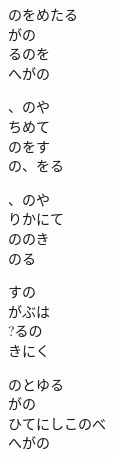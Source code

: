 \documentclass[10pt,b5j]{tarticle} %
\begin{document}
\vspace{1.5em} %
\newcommand{\linespace}{0.5em} %
\newcommand{\blocksize}{0.5\hsize} %
\begin{enumerate} %
    \begin{minipage}[c]{\blocksize}
    
        \vspace{\linespace}
        \item
        のをめたる\\
        がの\\
        るのを\\
        へがの
        
        \vspace{\linespace}
        \item
        、のや\\
        ちめて\\
        のをす\\
        の、をる
        
        \vspace{\linespace}
        \item
        、のや\\
        りかにて\\
        ののき\\
        のる
        
        \vspace{\linespace}
        \item
        すの\\
        がぶは\\
        ?るの\\
        きにく
        
        \vspace{\linespace}
        \item
        のとゆる\\
        がの\\
        ひてにしこのべ\\
        へがの
        

\end{minipage}
\end{enumerate}
\end{document}

